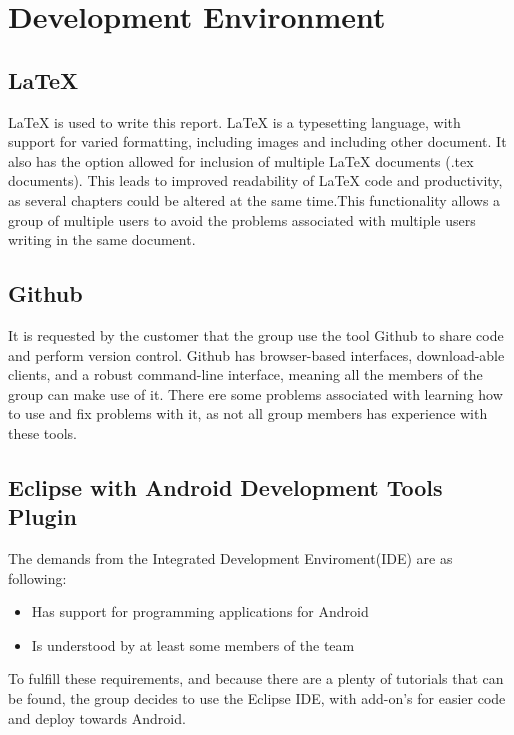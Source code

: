 \chapter{Development Environment}

\section{LaTeX}
LaTeX is used to write this report. LaTeX is a typesetting language, with support for varied formatting, including images and including other document. It also has the option allowed for inclusion of multiple LaTeX documents (.tex documents). This leads to improved readability of LaTeX code and productivity, as several chapters could be altered at the same time.This functionality allows a group of multiple users to avoid the problems associated with multiple users writing in the same document.
\section{Github}
It is requested by the customer that the group use the tool Github to share code and perform version control. Github has browser-based interfaces, download-able clients, and a robust command-line interface, meaning all the members of the group can make use of it. There ere some problems associated with learning how to use and fix problems with it, as not all group members has experience with these tools. 

\section{Eclipse with Android Development Tools Plugin}
The demands from the Integrated Development Enviroment(IDE) are as following:
\begin{itemize}
\item Has support for programming applications for Android
\item Is understood by at least some members of the team
\end{itemize}
To fulfill these requirements, and because there are a plenty of tutorials that can be found, the group decides to use the Eclipse IDE, with add-on's for easier code and deploy towards Android. 


 
